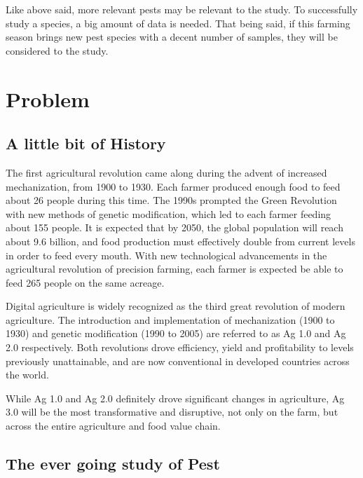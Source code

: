 Like above said, more relevant pests may be relevant to the study. To successfully study a species, a big amount of data is needed. That being said, if this farming season brings new pest species with a decent number of samples, they will be considered to the study.



\section{Problem} %
\label{sec:problem}

\subsection{A little bit of History} %
\label{sec:problem_history}

The first agricultural revolution came along during the advent of increased mechanization, from 1900 to 1930. Each farmer produced enough food to feed about 26 people during this time.
%
The 1990s prompted the Green Revolution with new methods of genetic modification, which led to each farmer feeding about 155 people.
%
It is expected that by 2050, the global population will reach about 9.6 billion, and food production must effectively double from current levels in order to feed every mouth. With new technological advancements in the agricultural revolution of precision farming, each farmer is expected be able to feed 265 people on the same acreage.

Digital agriculture is widely recognized as the third great revolution of modern agriculture. The introduction and implementation of mechanization (1900 to 1930) and genetic modification (1990 to 2005) are referred to as Ag 1.0 and Ag 2.0 respectively. Both revolutions drove efficiency, yield and profitability to levels previously unattainable, and are now conventional in developed countries across the world.

While Ag 1.0 and Ag 2.0 definitely drove significant changes in agriculture, Ag 3.0 will be the most transformative and disruptive, not only on the farm, but across the entire agriculture and food value chain.

\subsection{The ever going study of Pest}

